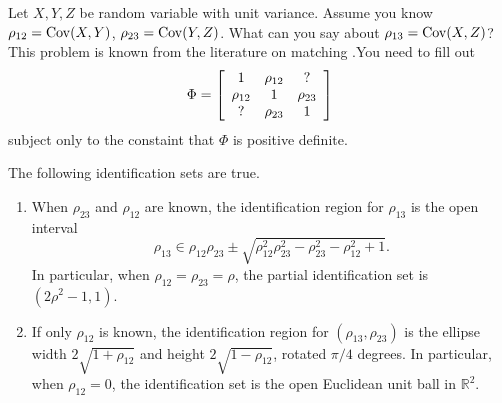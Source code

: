 Let $X,Y,Z$ be random variable with unit variance. Assume you know
$\rho_{12}=\operatorname{Cov}(X,Y)$, $\rho_{23}=\operatorname{Cov}(Y,Z)$. What can you say about
$\rho_{13}=\operatorname{Cov}(X,Z)$? This problem is known from the literature
on matching \parencite{Rassler2012-rp}.You need to fill out
\[
\Phi=\left[\begin{array}{ccc}
1 & \rho_{12} & ?\\
\rho_{12} & 1 & \rho_{23}\\
\text{\ensuremath{?}} & \rho_{23} & 1
\end{array}\right]
\]
subject only to the constaint that $\Phi$ is positive definite. 
\begin{proposition}
\label{prop:correlation identification}The following identification
sets are true.
\begin{enumerate}
\item When $\rho_{23}$ and $\rho_{12}$ are known, the identification region
for $\rho_{13}$ is the open interval
\begin{equation}
\rho_{13}\in\rho_{12}\rho_{23}\pm\sqrt{\rho_{12}^{2}\rho_{23}^{2}-\rho_{23}^{2}-\rho_{12}^{2}+1}.\label{eq:identification set correlation}
\end{equation}
In particular, when $\rho_{12}=\rho_{23}=\rho$, the partial identification
set is $(2\rho^{2}-1,1)$. 
\item If only $\rho_{12}$ is known, the identification region for $(\rho_{13},\rho_{23})$
is the ellipse width $2\sqrt{1+\rho_{12}}$ and height $2\sqrt{1-\rho_{12}}$,
rotated $\pi/4$ degrees. In particular, when $\rho_{12}=0$, the
identification set is the open Euclidean unit ball in $\mathbb{R}^{2}$.
\end{enumerate}
\end{proposition}

